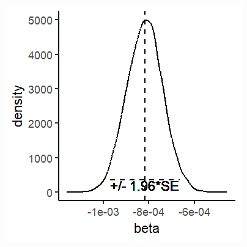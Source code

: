 \documentclass[xcolor=x11names,compress]{beamer}\usepackage[]{graphicx}\usepackage[]{color}
\makeatletter
\def\maxwidth{ %
  \ifdim\Gin@nat@width>\linewidth
    \linewidth
  \else
    \Gin@nat@width
  \fi
}
\newenvironment{knitrout}{}{} %
\renewcommand{\(}{\begin{columns}}
\renewcommand{\)}{\end{columns}}
\newcommand{\<}[1]{\begin{column}{#1}}
\renewcommand{\>}{\end{column}}
\makeatother
\begin{document}
\begin{frame}
\begin{multicols}{2}
\columnbreak
\begin{knitrout}
\color{fgcolor}
\includegraphics[width=\maxwidth]{figure/beta_dist_3-1} 

\end{knitrout}
\end{multicols}
\end{frame}
\end{document}
